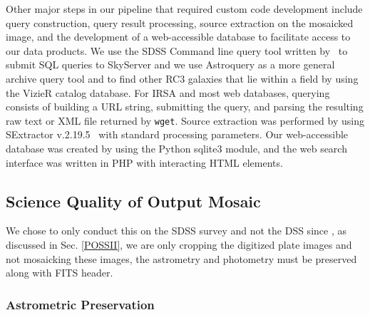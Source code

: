 \documentclass[authoryear, 12pt, 5p, times]{elsarticle}
\begin{document}
Other major steps in our pipeline that required custom code development include query construction, query result processing, source extraction on the mosaicked image, and the development of a web-accessible database to facilitate access to our data products. We use the SDSS Command line query tool written by~\cite{sqlclref}  to submit SQL queries to SkyServer and we use Astroquery as a more general archive query tool and to find other RC3 galaxies that lie within a field by using the VizieR catalog database. For IRSA and most web databases, querying consists of building a URL string, submitting the query, and parsing the resulting  raw text or XML file returned by \texttt{wget}. Source extraction was performed by using SExtractor v.2.19.5~\citep{sextractor} with standard processing parameters. Our web-accessible database was created by using the Python sqlite3 module, and the web search interface was written in PHP with interacting HTML elements.
\subsection{Science Quality of Output Mosaic\label{preserved}}
We chose to only conduct this on the SDSS survey and not the DSS since 
, as discussed in Sec. \ref{POSSII}, we are only cropping the digitized plate images and not mosaicking these images, the astrometry and photometry must be preserved along with FITS header.
\subsubsection{Astrometric Preservation\label{astrometry}}
\end{document}
